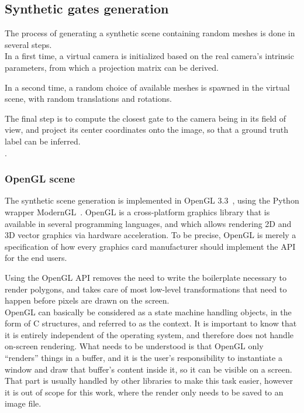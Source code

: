 \subsection{Synthetic gates generation}

The process of generating a synthetic scene containing random meshes is done in
several steps.\\

In a first time, a virtual camera is initialized based on the real camera's intrinsic
parameters, from which a projection matrix can be derived.

In a second time, a random choice of available meshes is spawned in the virtual
scene, with random translations and rotations.

The final step is to compute the closest gate to the camera being in its field
of view, and project its center coordinates onto the image, so that a
ground truth label can be inferred.\\

.

	\subsubsection{OpenGL scene}

The synthetic scene generation is implemented in OpenGL 3.3~\cite{OpenGL},
using the Python wrapper ModernGL~\cite{ModernGL}. 
OpenGL is a cross-platform graphics library that is available in several
programming languages, and which allows rendering 2D and 3D vector graphics via
hardware acceleration. To be precise, OpenGL is merely a specification of how
every graphics card manufacturer should implement the API for the end users.

Using the OpenGL API removes the need to write the boilerplate necessary to
render polygons, and takes care of most low-level transformations that need to
happen before pixels are drawn on the screen.\\


OpenGL can basically be considered as a state machine handling objects, in the
form of C structures, and referred to as the context. It is important to know
that it is entirely independent of the operating system, and therefore does
not handle on-screen rendering. What needs to be understood is that OpenGL only
``renders'' things in a buffer, and it is the user's responsibility to
instantiate a window and draw that buffer's content inside it, so it can be
visible on a screen. That part is usually handled by other libraries to make
this task easier, however it is out of scope for this work, where the render
only needs to be saved to an image file.\\

